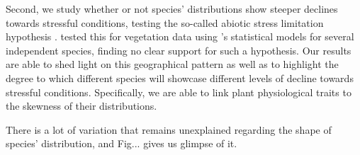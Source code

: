 \documentclass[11pt, a4paper]{article}
\begin{document}
Second, we study whether or not species' distributions show steeper declines towards stressful conditions, testing the so-called abiotic stress limitation hypothesis \citep{Loutlain 2015 TREE}. \citet{normandImportanceAbioticStress2009} tested this for vegetation data using \citeauthor{huismanHierarchicalSetModels1993}'s statistical models for several independent species, finding no clear support for such a hypothesis. Our results are able to shed light on this geographical pattern as well as to highlight the degree to which different species will showcase different levels of decline towards stressful conditions. Specifically, we are able to link plant physiological traits to the skewness of their distributions.

There is a lot of variation that remains unexplained regarding the shape of species' distribution, and Fig... gives us glimpse of it. 


\clearpage

\end{document}
